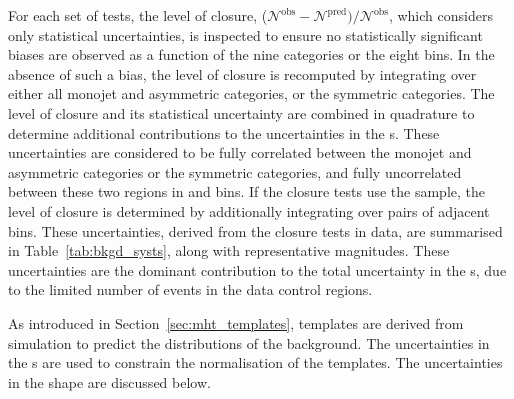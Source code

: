 For each set of tests, the level of closure, %
($\mathcal{N}^\text{obs} - \mathcal{N}^\text{pred}) /
\mathcal{N}^\text{obs}$, which considers only statistical
uncertainties, is inspected to ensure no statistically significant
biases are observed as a function of the nine \njet categories or the
eight \scalht bins. In the absence of such a bias, the level of
closure is recomputed by integrating over either all monojet and
asymmetric \njet categories, or the symmetric \njet categories. The
level of closure and its statistical uncertainty are combined in
quadrature to determine additional contributions to the uncertainties
in the {\tf}s. These uncertainties are considered to be
fully correlated between the monojet and asymmetric \njet categories
or the symmetric \njet categories, and fully uncorrelated between
these two regions in \njet and \scalht bins. If the closure tests use
the \mmj sample, the level of closure is determined by additionally
integrating over pairs of adjacent \scalht bins. These uncertainties,
derived from the closure tests in data, are summarised in
Table~\ref{tab:bkgd_systs}, along with representative
magnitudes. These uncertainties are the dominant contribution to the
total uncertainty in the {\tf}s, due to the limited number
of events in the data control regions.




As introduced in Section~\ref{sec:mht_templates}, templates are
derived from simulation to predict the \HTmiss distributions of the
background. The uncertainties in the {\tf}s are used to constrain the
normalisation of the \HTmiss templates. The uncertainties in the
\HTmiss shape are discussed below.


